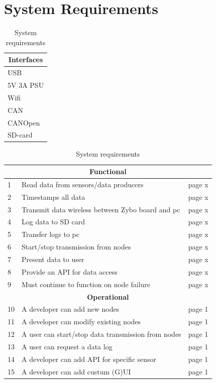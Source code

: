 \section{System Requirements} %
\label{sec:system_requirements}


\begin{table}[h]
\centering
\caption{System requirements}
\label{tab:requirements}

\begin{tabular}{ |p{3cm}| }
	\hline
	\multicolumn{1}{|c|}{\textbf{Interfaces}}\\
	\hline
	\centering
	USB \\
	5V 3A PSU \\
	Wifi \\
	CAN \\
	CANOpen \\
	SD-card \\
\end{tabular}


\begin{tabular}{ |p{0.3cm}|p{8.5cm}|p{1cm}| }
\hline
\multicolumn{3}{|c|}{\textbf{Functional}}\\
\hline
1 & Read data from sensors/data producers 				& page x \\
2 & Timestamps all data 								& page x \\
3 & Transmit data wireless between Zybo board and pc 	& page x \\
4 & Log data to SD card 								& page x \\
5 & Transfer logs to pc 								& page x \\
6 & Start/stop transmission from nodes 					& page x \\
7 & Present data to user								& page x \\
8 & Provide an API for data access						& page x \\
9 & Must continue to function on node failure			& page x \\

\hline
\multicolumn{3}{|c|}{\textbf{Operational}}\\
\hline	
10 & A developer can add new nodes 						& page 1 \\
11 & A developer can modify existing nodes 				& page 1 \\
12 & A user can start/stop data transmission from nodes	& page 1 \\
13 & A user can request a data log 						& page 1 \\
14 & A developer can add API for specific sensor 		& page 1 \\
15 & A developer can add custum (G)UI					& page 1 \\



\end{tabular}
\end{table}
